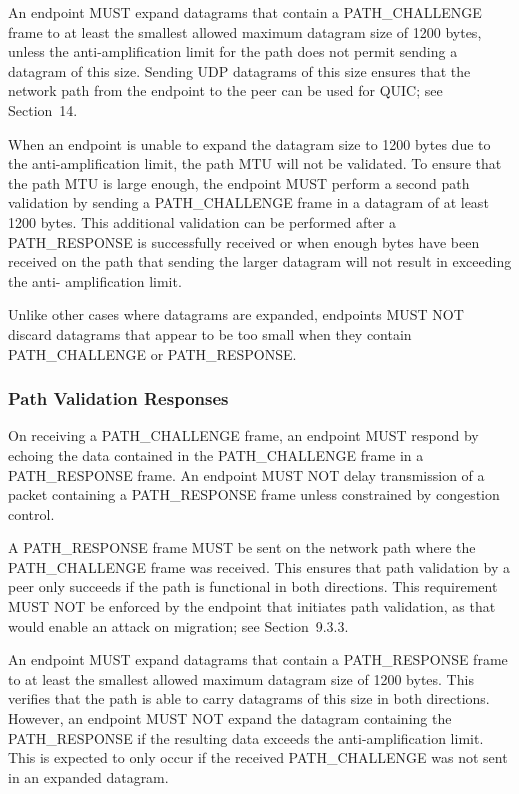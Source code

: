 \documentclass{article}
\begin{document}
An endpoint MUST expand datagrams that contain a PATH\_CHALLENGE frame to at least the smallest allowed maximum datagram size of 1200 bytes, unless the anti-amplification limit for the path does not permit sending a datagram of this size.  Sending UDP datagrams of this size ensures that the network path from the endpoint to the peer can be used for QUIC; see Section~14.

When an endpoint is unable to expand the datagram size to 1200 bytes due to the anti-amplification limit, the path MTU will not be validated.  To ensure that the path MTU is large enough, the endpoint MUST perform a second path validation by sending a PATH\_CHALLENGE frame in a datagram of at least 1200 bytes.  This additional validation can be performed after a PATH\_RESPONSE is successfully received or when enough bytes have been received on the path that sending the larger datagram will not result in exceeding the anti- amplification limit.

Unlike other cases where datagrams are expanded, endpoints MUST NOT discard datagrams that appear to be too small when they contain PATH\_CHALLENGE or PATH\_RESPONSE.

\subsubsection{Path Validation Responses}

On receiving a PATH\_CHALLENGE frame, an endpoint MUST respond by echoing the data contained in the PATH\_CHALLENGE frame in a PATH\_RESPONSE frame.  An endpoint MUST NOT delay transmission of a packet containing a PATH\_RESPONSE frame unless constrained by congestion control.

A PATH\_RESPONSE frame MUST be sent on the network path where the PATH\_CHALLENGE frame was received.  This ensures that path validation by a peer only succeeds if the path is functional in both directions. This requirement MUST NOT be enforced by the endpoint that initiates path validation, as that would enable an attack on migration; see Section~9.3.3.

An endpoint MUST expand datagrams that contain a PATH\_RESPONSE frame to at least the smallest allowed maximum datagram size of 1200 bytes. This verifies that the path is able to carry datagrams of this size in both directions.  However, an endpoint MUST NOT expand the datagram containing the PATH\_RESPONSE if the resulting data exceeds the anti-amplification limit.  This is expected to only occur if the received PATH\_CHALLENGE was not sent in an expanded datagram.
\end{document}
